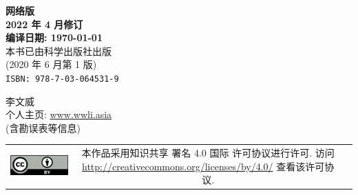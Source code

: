 \begin{titlepage}
\clearpage	%
\begin{center}
	\Large{\sffamily\bfseries\thmheiti 网络版 \\ 2022 年 4 月修订} \\ \vspace{2em}
	\Large{\sffamily\bfseries\thmheiti 编译日期: \today} \\ \vspace{1em}
	本书已由科学出版社出版 \\
	(2020 年 6 月第 1 版) \\
	\texttt{ISBN: 978-7-03-064531-9}
\end{center}
\vfill


\begin{flushleft} \small
	李文威 \\
	个人主页: \href{https://www.wwli.asia}{www.wwli.asia} \\
	(含勘误表等信息)
\end{flushleft}
\vspace{1.5em}
\begin{tabular*}{\textwidth}{ccc}
	\includegraphics{ccby.png}
	& \begin{minipage}[b]{0.6\textwidth}
		\small\sffamily
		本作品采用知识共享 署名 4.0 国际 许可协议进行许可. 访问 \url{http://creativecommons.org/licenses/by/4.0/} 查看该许可协议.
	\end{minipage}
\end{tabular*}

\cleardoublepage
\end{titlepage}
